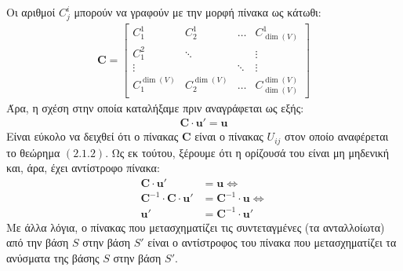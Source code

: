 \documentclass[main.tex]{subfiles}
\begin{document}
	Οι αριθμοί $C^i_j$ μπορούν να γραφούν με την μορφή πίνακα ως κάτωθι:
	\begin{align*}
		\boldsymbol{C} = \begin{bmatrix}
			C^1_1 & C^1_2 & \ldots & C^1_{\dim(V)} \\
			C^2_1 & \ddots & & \vdots\\
			\vdots & & \ddots & \vdots \\
			C^{\dim(V)}_1 & C^{\dim(V)}_2 & \ldots & C^{\dim(V)}_{\dim(V)}
		\end{bmatrix}
	\end{align*}
	Άρα, η σχέση στην οποία καταλήξαμε πριν αναγράφεται ως εξής:
	\begin{align*}
		\boldsymbol{C}\cdot\boldsymbol{u'} = \boldsymbol{u}
	\end{align*}
	Είναι εύκολο να δειχθεί ότι ο πίνακας $\boldsymbol{C}$ είναι ο πίνακας $U_{ij}$ στον οποίο αναφέρεται το θεώρημα $(2.1.2)$. Ως εκ τούτου, ξέρουμε ότι η ορίζουσά του είναι μη μηδενική και, άρα, έχει αντίστροφο πίνακα:
	\begin{align*}
		\boldsymbol{C}\cdot\boldsymbol{u}' &= \boldsymbol{u} \Leftrightarrow\\
		\boldsymbol{C}^{-1}\cdot\boldsymbol{C}\cdot\boldsymbol{u}' &= \boldsymbol{C}^{-1}\cdot\boldsymbol{u} \Leftrightarrow\\
		\boldsymbol{u}' &= \boldsymbol{C}^{-1}\cdot\boldsymbol{u}'
	\end{align*}
	Με άλλα λόγια, ο πίνακας που μετασχηματίζει τις συντεταγμένες (τα ανταλλοίωτα) από την βάση $S$ στην βάση $S'$ είναι ο αντίστροφος του πίνακα που μετασχηματίζει τα ανύσματα της βάσης $S$ στην βάση $S'$. 
	
\end{document}
